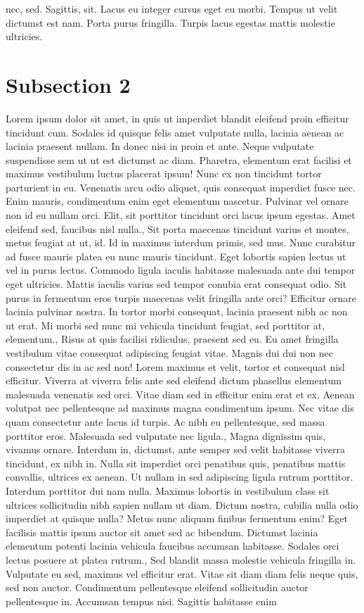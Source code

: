 \documentclass{source/tex/templates/maththesis}
\begin{document}
nec, sed. Sagittis, sit. Lacus eu integer cursus eget eu morbi. Tempus ut velit dictumst est nam. Porta purus fringilla. Turpis lacus egestas mattis molestie ultricies.

\hypertarget{subsection-2-1}{%
\section{Subsection 2}\label{subsection-2-1}}

Lorem ipsum dolor sit amet, in quis ut imperdiet blandit eleifend proin efficitur tincidunt cum. Sodales id quisque felis amet vulputate nulla, lacinia aenean ac lacinia praesent nullam. In donec nisi in proin et ante. Neque vulputate suspendisse sem ut ut est dictumst ac diam. Pharetra, elementum erat facilisi et maximus vestibulum luctus placerat ipsum! Nunc ex non tincidunt tortor parturient in eu. Venenatis arcu odio aliquet, quis consequat imperdiet fusce nec. Enim mauris, condimentum enim eget elementum nascetur. Pulvinar vel ornare non id eu nullam orci. Elit, sit porttitor tincidunt orci lacus ipsum egestas. Amet eleifend sed, faucibus nisl nulla., Sit porta maecenas tincidunt varius et montes, metus feugiat at ut, id. Id in maximus interdum primis, sed mus. Nunc curabitur ad fusce mauris platea eu nunc mauris tincidunt. Eget lobortis sapien lectus ut vel in purus lectus. Commodo ligula iaculis habitasse malesuada ante dui tempor eget ultricies. Mattis iaculis varius sed tempor conubia erat consequat odio. Sit purus in fermentum eros turpis maecenas velit fringilla ante orci? Efficitur ornare lacinia pulvinar nostra. In tortor morbi consequat, lacinia praesent nibh ac non ut erat. Mi morbi sed nunc mi vehicula tincidunt feugiat, sed porttitor at, elementum., Risus at quis facilisi ridiculus, praesent sed eu. Eu amet fringilla vestibulum vitae consequat adipiscing feugiat vitae. Magnis dui dui non nec consectetur dis in ac sed non! Lorem maximus et velit, tortor et consequat nisl efficitur. Viverra at viverra felis ante sed eleifend dictum phasellus elementum malesuada venenatis sed orci. Vitae diam sed in efficitur enim erat et ex. Aenean volutpat nec pellentesque ad maximus magna condimentum ipsum. Nec vitae dis quam consectetur ante lacus id turpis. Ac nibh eu pellentesque, sed massa porttitor eros. Malesuada sed vulputate nec ligula., Magna dignissim quis, vivamus ornare. Interdum in, dictumst, ante semper sed velit habitasse viverra tincidunt, ex nibh in. Nulla sit imperdiet orci penatibus quis, penatibus mattis convallis, ultrices ex aenean. Ut nullam in sed adipiscing ligula rutrum porttitor. Interdum porttitor dui nam nulla. Maximus lobortis in vestibulum class sit ultrices sollicitudin nibh sapien nullam ut diam. Dictum nostra, cubilia nulla odio imperdiet at quisque nulla? Metus nunc aliquam finibus fermentum enim? Eget facilisis mattis ipsum auctor sit amet sed ac bibendum. Dictumst lacinia elementum potenti lacinia vehicula faucibus accumsan habitasse. Sodales orci lectus posuere at platea rutrum., Sed blandit massa molestie vehicula fringilla in. Vulputate eu sed, maximus vel efficitur erat. Vitae sit diam diam felis neque quis, sed non auctor. Condimentum pellentesque eleifend sollicitudin auctor pellentesque in. Accumsan tempus nisi. Sagittis habitasse enim 
\end{document}
